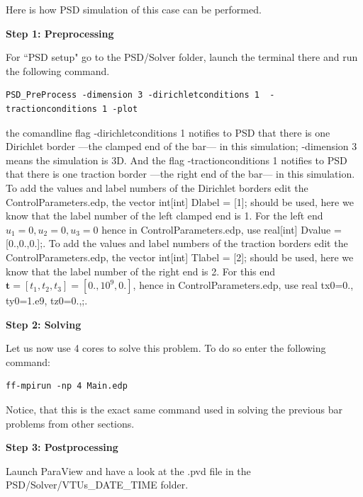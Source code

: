 \documentclass{report}
\begin{document}
Here is how PSD simulation of this case can be performed.

\textbf{Step 1: Preprocessing}

For ``PSD setup" go to the {\ttfamily PSD/Solver} folder, launch the terminal there and run the following command.
\begin{lstlisting}[style=Linux]
PSD_PreProcess -dimension 3 -dirichletconditions 1  -tractionconditions 1 -plot
\end{lstlisting}
%
the comandline flag {\ttfamily -dirichletconditions 1} notifies to PSD that there is one Dirichlet border ---the clamped end of the bar--- in this simulation; {\ttfamily -dimension 3} means the simulation is 3D. And the flag {\ttfamily -tractionconditions 1} notifies to PSD that there is one traction border ---the right end of the bar--- in this simulation. 
To add the values and label numbers of the Dirichlet borders edit the  {\ttfamily ControlParameters.edp},  the vector {\ttfamily int[int] Dlabel = [1];} should be used, here we know that the label number of the left clamped end is 1. For the left end $u_1=0,u_2=0,u_3=0$ hence in {\ttfamily ControlParameters.edp}, use {\ttfamily real[int]   Dvalue = [0.,0.,0.];}. To add the values and label numbers of the traction borders edit the  {\ttfamily ControlParameters.edp},  the vector {\ttfamily int[int] Tlabel = [2];} should be used, here we know that the label number of the right end is 2. For this end $\mathbf t=[t_1,t_2,t_3]=[0.,10^9,0.]$, hence in {\ttfamily ControlParameters.edp}, use {\ttfamily real  tx0=0., ty0=1.e9, tz0=0.,;}. 


\textbf{Step 2: Solving}

Let us now use 4 cores to solve this problem. To do so enter the following command:

\begin{lstlisting}[style=Linux]
ff-mpirun -np 4 Main.edp
\end{lstlisting}
%
Notice, that this is the exact same command used in solving the previous bar problems from other sections.


\textbf{Step 3: Postprocessing}

Launch ParaView and have a look at the  {\ttfamily .pvd} file in the  {\ttfamily PSD/Solver/VTUs\_DATE\_TIME} folder. 
\end{document}
